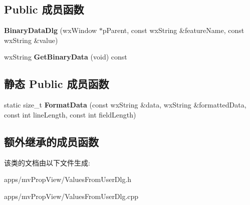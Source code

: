 \subsection*{Public 成员函数}
\begin{DoxyCompactItemize}
\item 
\hypertarget{class_binary_data_dlg_a5b31734a664a081d2042c0cbde867c6c}{{\bfseries Binary\+Data\+Dlg} (wx\+Window $\ast$p\+Parent, const wx\+String \&feature\+Name, const wx\+String \&value)}\label{class_binary_data_dlg_a5b31734a664a081d2042c0cbde867c6c}

\item 
\hypertarget{class_binary_data_dlg_a82b8bf026fbf730609806c1939168d53}{wx\+String {\bfseries Get\+Binary\+Data} (void) const }\label{class_binary_data_dlg_a82b8bf026fbf730609806c1939168d53}

\end{DoxyCompactItemize}
\subsection*{静态 Public 成员函数}
\begin{DoxyCompactItemize}
\item 
\hypertarget{class_binary_data_dlg_ad67ae20de078c31bbc032ae429b13a65}{static size\+\_\+t {\bfseries Format\+Data} (const wx\+String \&data, wx\+String \&formatted\+Data, const int line\+Length, const int field\+Length)}\label{class_binary_data_dlg_ad67ae20de078c31bbc032ae429b13a65}

\end{DoxyCompactItemize}
\subsection*{额外继承的成员函数}


该类的文档由以下文件生成\+:\begin{DoxyCompactItemize}
\item 
apps/mv\+Prop\+View/Values\+From\+User\+Dlg.\+h\item 
apps/mv\+Prop\+View/Values\+From\+User\+Dlg.\+cpp\end{DoxyCompactItemize}
